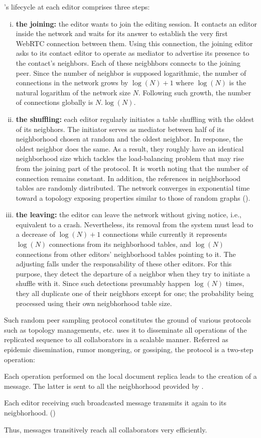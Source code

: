 \SPRAY's lifecycle at each editor comprises three steps:
\begin{enumerate}[(i)]
\item \textbf{the joining:} the editor wants to join the editing session. It
  contacts an editor inside the network and waits for its answer to establish
  the very first WebRTC connection between them. Using this connection, the
  joining editor asks to its contact editor to operate as mediator to advertise
  its presence to the contact's neighbors. Each of these neigbhbors connects to
  the joining peer. Since the number of neighbor is supposed logarithmic, the
  number of connections in the network grows by $\log(N)+1$ where $\log(N)$ is
  the natural logarithm of the network size $N$. Following such growth, the
  number of connections globally is $N.\log(N)$.
\item \textbf{the shuffling:} each editor regularly initiates a table shuffling
  with the oldest of its neigbhors. The initiator serves as mediator between
  half of its neighborhood chosen at random and the oldest neighbor. In
  response, the oldest neighbor does the same. As a result, they roughly have an
  identical neighborhood size which tackles the load-balancing problem that may
  rise from the joining part of the protocol. It is worth noting that the number
  of connection remains constant. In addition, the references in neighborhood
  tables are randomly distributed. The network converges in exponential time
  toward a topology exposing properties similar to those of random graphs
  (\REF).
\item \textbf{the leaving:} the editor can leave the network without giving
  notice, i.e., equivalent to a crash. Nevertheless, its removal from the system
  must lead to a decrease of $\log(N)+1$ connections while currently it
  represents $\log(N)$ connections from its neighborhood tables, and $\log(N)$
  connections from other editors' neighborhood tables pointing to it. The
  adjusting falls under the responsability of these other editors. For this
  purpose, they detect the departure of a neighbor when they try to initiate a
  shuffle with it. Since such detections presumably happen $\log(N)$ times, they
  all duplicate one of their neigbhors except for one; the probability being
  processed using their own neigbhorhood table size. 
\end{enumerate}

Such random peer sampling protocol constitutes the ground of various protocols
such as topology managements,  etc. \CRATE uses it to disseminate all
operations of the replicated sequence to all collaborators in a scalable
manner. Referred as epidemic disemination, rumor mongering, or gossiping, the
protocol is a two-step operation:
\begin{inparaenum}[(i)]
\item Each operation performed on the local document replica leads to the
  creation of a message. The latter is sent to all the neigbhorhood provided by
  \SPRAY.
\item Each editor receiving such broadcasted message transmits it again to its
  neigbhorhood. ()
\end{inparaenum}
Thus, messages transitively reach all collaborators very efficiently.
